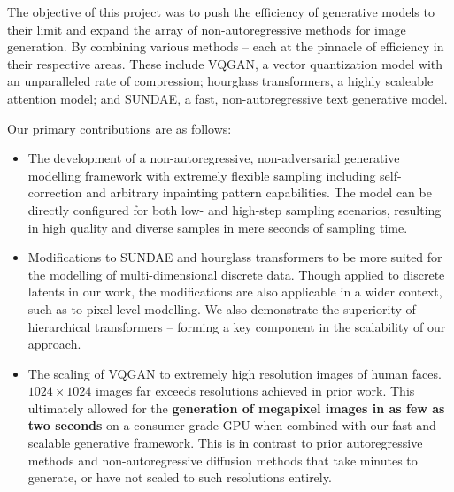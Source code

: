 \documentclass[14pt,margin=0.5in,innermargin=0in,blockverticalspace=-0.1in,colspace=-1.0cm]{tikzposter}
\begin{document}
\begin{columns}
{\begin{tcolorbox}[boxsep=0pt,top=0cm,title={\Large Proposed Method},colbacktitle=colorOne]
        The objective of this project was to push the efficiency of generative
        models to their limit and expand the array of non-autoregressive methods
        for image generation. By combining various methods -- each at the
        pinnacle of efficiency in their respective areas. These include VQGAN, a
        vector quantization model with an unparalleled rate of compression;
        hourglass transformers, a highly scaleable attention model; and SUNDAE,
        a fast, non-autoregressive text generative model.

        Our primary contributions are as follows:
        \begin{itemize}
            \item
                The development of a non-autoregressive, non-adversarial
                generative modelling framework with extremely flexible sampling
                including self-correction and arbitrary inpainting pattern
                capabilities. The model can be directly configured for both low-
                and high-step sampling scenarios, resulting in high quality and
                diverse samples in mere seconds of sampling time.

            \item
                Modifications to SUNDAE and hourglass transformers to be more
                suited for the modelling of multi-dimensional discrete data. Though
                applied to discrete latents in our work, the modifications are
                also applicable in a wider context, such as to pixel-level
                modelling. We also demonstrate the superiority of hierarchical
                transformers -- forming a key component in the scalability of
                our approach. 
            \item
                The scaling of VQGAN to extremely high resolution images of
                human faces. $1024 \times 1024$ images far exceeds resolutions
                achieved in prior work. This ultimately allowed for the
                \textbf{generation of megapixel images in as few as two seconds}
                on a consumer-grade GPU when combined with our fast and scalable
                generative framework. This is in contrast to prior
                autoregressive methods and non-autoregressive diffusion methods
                that take minutes to generate, or have not scaled to such
                resolutions entirely.

        \end{itemize}
        \end{tcolorbox}
    }


\end{columns}
\end{document}
